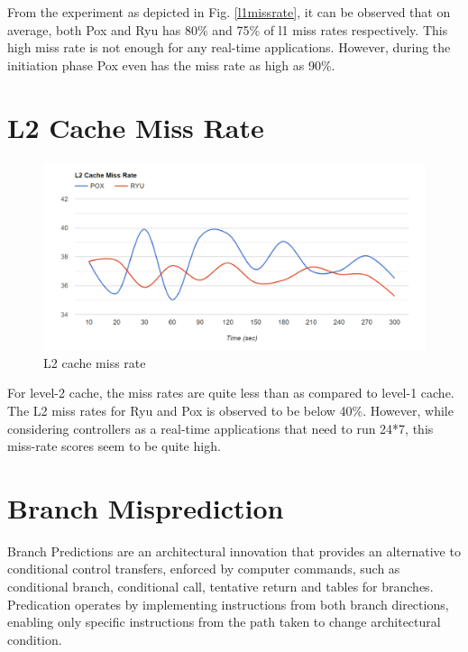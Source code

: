 From the experiment as depicted in Fig. \ref{l1missrate}, it can be observed that on average, both Pox and Ryu has 80\% and 75\% of l1 miss rates respectively. This high miss rate is not enough for any real-time applications. However, during the initiation phase Pox even has the miss rate as high as 90\%.

\section{L2 Cache Miss Rate}

\begin{figure}[!hbt]
    \centering
        \includegraphics[width=\textwidth,keepaspectratio]{images/l2_miss_rate.png}
       \caption{L2 cache miss rate}
        \label{l2missrate}
\end{figure}

For level-2 cache, the miss rates are quite less than as compared to level-1 cache. The L2 miss rates for Ryu and Pox is observed to be below 40\%. However, while considering controllers as a real-time applications that need to run 24*7, this miss-rate scores seem to be quite high.

\section{Branch Misprediction}

Branch Predictions are an architectural innovation that provides an alternative to conditional control transfers, enforced by computer commands, such as conditional branch, conditional call, tentative return and tables for branches. Predication operates by implementing instructions from both branch directions, enabling only specific instructions from the path taken to change architectural condition.

